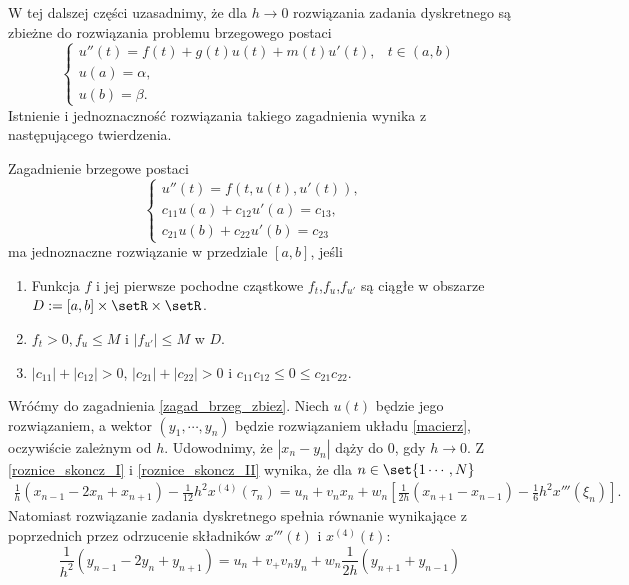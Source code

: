 W tej dalszej części uzasadnimy, że dla $h \to 0$ rozwiązania zadania dyskretnego są zbieżne do rozwiązania problemu brzegowego postaci
\begin{equation}\label{zagad_brzeg_zbiez}
\left\{\begin{array}{cl}
u''(t) = f(t) + g(t) u(t) + m(t) u'(t), &  t \in (a,b)\\
u(a) = \alpha, & \\
u(b) = \beta.
\end{array}\right.
\end{equation}
Istnienie i jednoznaczność rozwiązania takiego zagadnienia wynika z następującego twierdzenia.
\begin{theorem}
Zagadnienie brzegowe postaci
\begin{equation}
\left\{\begin{array}{cl}
u''(t) = f(t,u(t),u'(t)), & \\
c_{11}u(a) + c_{12}u'(a) = c_{13}, & \\
c_{21}u(b) + c_{22}u'(b) = c_{23}
\end{array}\right.
\end{equation}
ma jednoznaczne rozwiązanie w przedziale $[a,b]$, jeśli
\begin{enumerate}
\item Funkcja $f$ i jej pierwsze pochodne cząstkowe $f_t$,$f_u$,$f_{u'}$ są ciągłe w obszarze $D:= [a,b] \times \setR \times \setR$.
\item $f_t >0, f_u \leq M$ i $|f_{u'}| \leq M$ w $D$.
\item $|c_{11}| + |c_{12}| > 0$, $|c_{21}| + |c_{22}| >0$ i $c_{11}c_{12}\leq 0 \leq c_{21}c_{22}$.
\end{enumerate}
\end{theorem}
Wróćmy do zagadnienia \eqref{zagad_brzeg_zbiez}. Niech $u(t)$ będzie jego rozwiązaniem, a wektor $(y_1,\cdots,y_n)$ będzie rozwiązaniem układu \eqref{macierz}, oczywiście zależnym od $h$. Udowodnimy, że $|x_n - y_n|$ dąży do $0$, gdy $h \to 0$. Z \eqref{roznice_skoncz_I} i \eqref{roznice_skoncz_II} wynika, że dla $ n \in \set{1\cdots,N}$
$$
\begin{array}{cl}
\frac{1}{h} (x_{n-1} - 2x_n + x_{n+1}) - \frac{1}{12}h^2x^{(4)}(\tau_{n}) = u_n + v_nx_n + w_n\left[\frac{1}{2h}(x_{n+1} - x_{n-1}) - \frac{1}{6}h^2x'''(\xi_n)\right].
\end{array}
$$
Natomiast rozwiązanie zadania dyskretnego spełnia równanie wynikające z poprzednich przez odrzucenie składników $x'''(t)$ i $x^{(4)}(t)$:
$$
\frac{1}{h^2}(y_{n-1} -2y_n + y_{n+1})= u_n+v_+v_ny_n + w_n\frac{1}{2h} (y_{n+1}+y_{n-1})
$$
